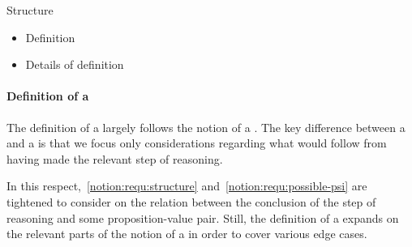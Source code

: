 \begin{note}
  Structure
  \begin{itemize}
  \item Definition
  \item Details of definition
  \end{itemize}
\end{note}

\paragraph{Definition of a \crequ{}}

\begin{note}
  The definition of a \crequ{} largely follows the notion of a \requ{}.
  The key difference between a \crequ{} and a \requ{} is that we focus only considerations regarding what would follow from having made the relevant step of reasoning.

  In this respect,~\ref{notion:requ:structure} and~\ref{notion:requ:possible-psi} are tightened to consider on the relation between the conclusion of the step of reasoning and some proposition-value pair.
  Still, the definition of a \crequ{} expands on the relevant parts of the notion of a \requ{} in order to cover various edge cases.
\end{note}

